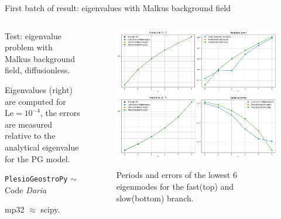 \documentclass[11pt,aspectratio=169]{beamer}
\begin{document}
\begin{frame}{First batch of result: eigenvalues with Malkus background field}
	\begin{columns}
	\begin{column}{.32\linewidth}
		Test: eigenvalue problem with Malkus background field, diffusionless.
		\vspace{1em}

		Eigenvalues (right) are computed for $\mathrm{Le}=10^{-4}$, the errors are measured relative to the analytical eigenvalue for the PG model.
		\vspace{1em}

		\texttt{PlesioGeostroPy} $\sim$ Code \textit{Daria}
		
		mp32 $\approx$ scipy.
	\end{column}
	\begin{column}{.6\linewidth}
		\begin{figure}
			\centering
			\includegraphics[width=.9\linewidth]{../out/imgs/err_comparison_east__PG.pdf}
			\includegraphics[width=.9\linewidth]{../out/imgs/err_comparison_west__PG.pdf}
			\caption{Periods and errors of the lowest 6 eigenmodes for the fast(top) and slow(bottom) branch.}
		\end{figure}
	\end{column}
	\end{columns}
\end{frame}
\end{document}
